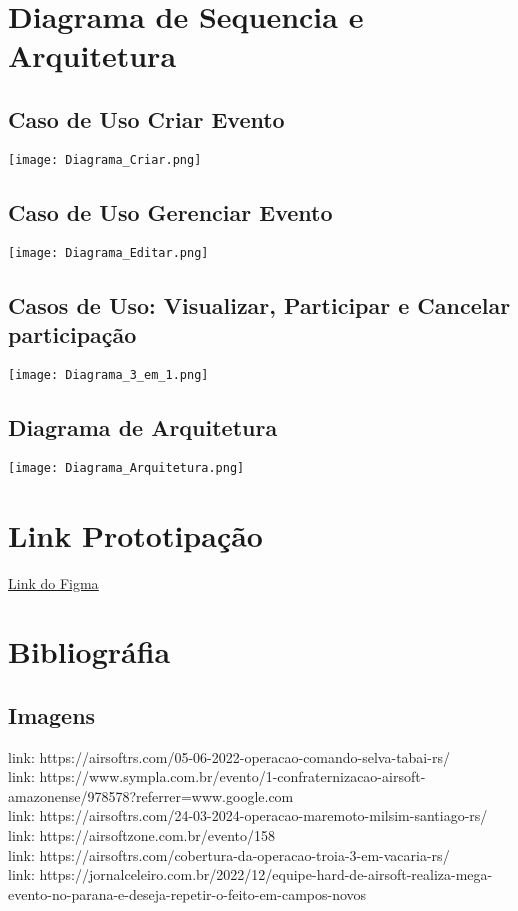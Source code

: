 \documentclass[12pt,a4paper]{article}
\begin{document}
\section{Diagrama de Sequencia e Arquitetura}

\subsection{Caso de Uso Criar Evento}
 \texttt{[image: Diagrama\_Criar.png]}

\subsection{Caso de Uso Gerenciar Evento}
 \texttt{[image: Diagrama\_Editar.png]}


\subsection{Casos de Uso: Visualizar, Participar e Cancelar participação}
 \texttt{[image: Diagrama\_3\_em\_1.png]}

\subsection{Diagrama de Arquitetura}
 \texttt{[image: Diagrama\_Arquitetura.png]}

\section{Link Prototipação}
\href{https://www.figma.com/design/hQo4WzJU1nHs5j3TelntQZ/Sem-t%C3%ADtulo?node-id=0-1&p=f}{\color{blue}\uline{Link do Figma}}


\section{Bibliográfia}

\subsection{Imagens}
\sloppy
link: https://airsoftrs.com/05-06-2022-operacao-comando-selva-tabai-rs/ \\
link: https://www.sympla.com.br/evento/1-confraternizacao-airsoft-amazonense/978578?referrer=www.google.com \\
link: https://airsoftrs.com/24-03-2024-operacao-maremoto-milsim-santiago-rs/ \\
link: https://airsoftzone.com.br/evento/158 \\
link: https://airsoftrs.com/cobertura-da-operacao-troia-3-em-vacaria-rs/ \\
link: https://jornalceleiro.com.br/2022/12/equipe-hard-de-airsoft-realiza-mega-evento-no-parana-e-deseja-repetir-o-feito-em-campos-novos \\
\end{document}
